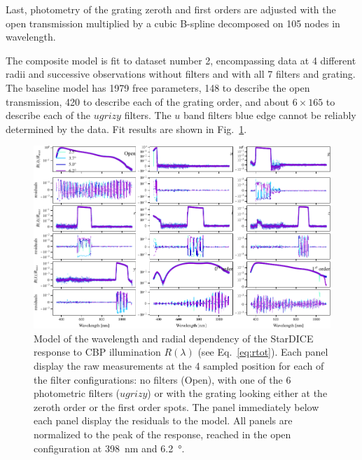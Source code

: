 Last, photometry of the grating zeroth and first orders are adjusted
with the open transmission multiplied by a cubic B-spline decomposed
on 105 nodes in wavelength.

The composite model is fit to dataset number 2, encompassing data at 4
different radii and successive observations without filters and with
all 7 filters and grating. The baseline model has \num{1979} free
parameters, \num{148} to describe the open transmission, \num{420} to
describe each of the grating order, and about $6\times165$ to describe
each of the $ugrizy$ filters. The $u$ band filters blue edge cannot be
reliably determined by the data. Fit results are shown in
Fig.~\ref{fig:lambdathetafitresults}.

\begin{figure}
  \centering
  \includegraphics[width=1\linewidth]{./fig/lambdathetafitresults.pdf}
  \caption{Model of the wavelength and radial dependency of the
    StarDICE response to CBP illumination $R(\lambda)$ (see
    Eq.~\ref{eq:rtot}). Each panel display the raw measurements at
    the 4 sampled position for each of the filter configurations: no
    filters (Open), with one of the 6 photometric filters ($ugrizy$)
    or with the grating looking either at the zeroth order or the
    first order spots. The panel immediately below each panel
    display the residuals to the model. All panels are normalized to
    the peak of the response, reached in the open configuration at
    \SI{398}{nm} and \SI{6.2}{\degree}.  }
  \label{fig:lambdathetafitresults}
\end{figure}


